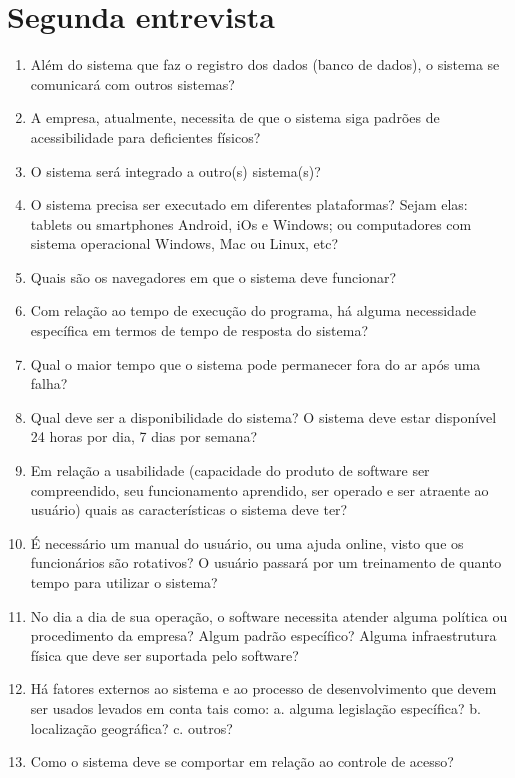 \section{Segunda entrevista}

\begin{enumerate}
 \item Além do sistema que faz o registro dos dados (banco de dados), o sistema se comunicará com outros sistemas?
 \item A empresa, atualmente, necessita de que o sistema siga padrões de acessibilidade para deficientes físicos?
 \item O sistema será integrado a outro(s) sistema(s)?
 \item O sistema precisa ser executado em diferentes plataformas? Sejam elas: tablets ou smartphones Android, iOs e Windows; ou computadores com sistema operacional Windows, Mac ou Linux, etc?
 \item Quais são os navegadores em que o sistema deve funcionar?
 \item Com relação ao tempo de execução do programa, há alguma necessidade específica em termos de tempo de resposta do sistema?
 \item Qual o maior tempo que o sistema pode permanecer fora do ar após uma falha?
 \item Qual deve ser a disponibilidade do sistema? O sistema deve estar disponível 24 horas por dia, 7 dias por semana?
 \item Em relação a usabilidade (capacidade do produto de software ser compreendido, seu funcionamento aprendido, ser operado e ser atraente ao usuário) quais as características o sistema deve ter?
 \item É necessário um manual do usuário, ou uma ajuda online, visto que os funcionários são rotativos? O usuário passará por um treinamento de quanto tempo para utilizar o sistema?
 \item No dia a dia de sua operação, o software necessita atender alguma política ou procedimento da empresa? Algum padrão específico? Alguma infraestrutura física que deve ser suportada pelo software?
 \item Há fatores externos ao sistema e ao processo de desenvolvimento que devem ser usados levados em conta tais como:
  \subitem a. alguma legislação específica?
  \subitem b. localização geográfica?
  \subitem c. outros?
 \item Como o sistema deve se comportar em relação ao controle de acesso?
\end{enumerate}

